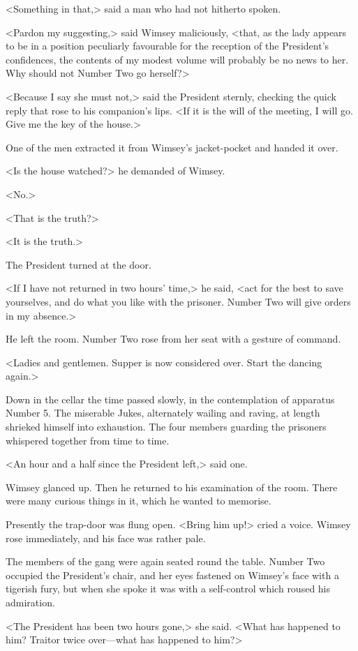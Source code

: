 <Something in that,> said a man who had not hitherto spoken.

<Pardon my suggesting,> said Wimsey maliciously, <that, as the lady appears to be in a position peculiarly favourable for the reception of the President's confidences, the contents of my modest volume will probably be no news to her. Why should not Number Two go herself?>

<Because I say she must not,> said the President sternly, checking the quick reply that rose to his companion's lips. <If it is the will of the meeting, I will go. Give me the key of the house.>

One of the men extracted it from Wimsey's jacket-pocket and handed it over.

<Is the house watched?> he demanded of Wimsey.

<No.>

<That is the truth?>

<It is the truth.>

The President turned at the door.

<If I have not returned in two hours' time,> he said, <act for the best to save yourselves, and do what you like with the prisoner. Number Two will give orders in my absence.>

He left the room. Number Two rose from her seat with a gesture of command.

<Ladies and gentlemen. Supper is now considered over. Start the dancing again.>

Down in the cellar the time passed slowly, in the contemplation of apparatus Number 5. The miserable Jukes, alternately wailing and raving, at length shrieked himself into exhaustion. The four members guarding the prisoners whispered together from time to time.

<An hour and a half since the President left,> said one.

Wimsey glanced up. Then he returned to his examination of the room. There were many curious things in it, which he wanted to memorise.

Presently the trap-door was flung open. <Bring him up!> cried a voice. Wimsey rose immediately, and his face was rather pale.

The members of the gang were again seated round the table. Number Two occupied the President's chair, and her eyes fastened on Wimsey's face with a tigerish fury, but when she spoke it was with a self-control which roused his admiration.

<The President has been two hours gone,> she said. <What has happened to him? Traitor twice over—what has happened to him?>

